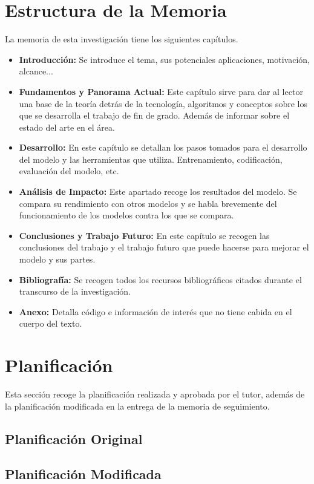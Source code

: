 \section{Estructura de la Memoria}
\label{sec:estructuramemoria}
La memoria de esta investigación tiene los siguientes capítulos.
\begin{itemize}
	\item \textbf{Introducción: } Se introduce el tema, sus potenciales aplicaciones, motivación, alcance... 
	\item \textbf{Fundamentos y Panorama Actual: } Este capítulo sirve para dar al lector una base de la teoría detrás de la tecnología, algoritmos y conceptos sobre los que se desarrolla el trabajo de fin de grado. Además de informar sobre el estado del arte en el área.
	\item \textbf{Desarrollo: } En este capítulo se detallan los pasos tomados para el desarrollo del modelo y las herramientas que utiliza. Entrenamiento, codificación, evaluación del modelo, etc. 
	\item \textbf{Análisis de Impacto: } Este apartado recoge los resultados del modelo. Se compara su rendimiento con otros modelos y se habla brevemente del funcionamiento de los modelos contra los que se compara.
	\item \textbf{Conclusiones y Trabajo Futuro: } En este capítulo se recogen las conclusiones del trabajo y el trabajo futuro que puede hacerse para mejorar el modelo y sus partes. 
	\item \textbf{Bibliografía: } Se recogen todos los recursos bibliográficos citados durante el transcurso de la investigación.
	\item \textbf{Anexo: } Detalla código e información de interés que no tiene cabida en el cuerpo del texto. 
\end{itemize}

\section{Planificación}
\label{sec:planificacion}
Esta sección recoge la planificación realizada y aprobada por el tutor, además de la planificación modificada en la entrega de la memoria de seguimiento.
\subsection{Planificación Original}



\subsection{Planificación Modificada}

